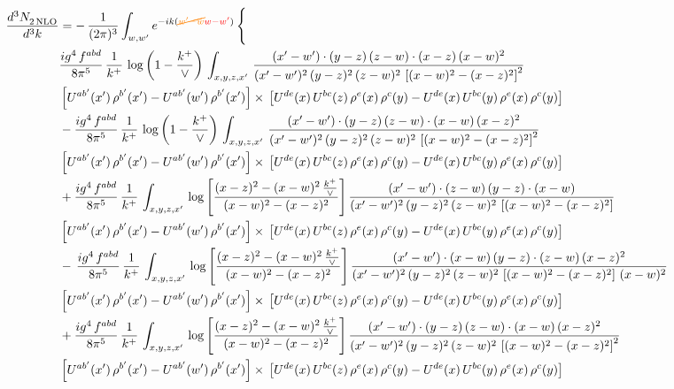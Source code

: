 \documentclass[9pt]{article}
\numberwithin{equation}{section}
\begin{document}
\begin{align}
   \frac{d^{3}N_{2\,\rm NLO}^{\rm}}{d^{3}k}  & =  -\,\frac{1}{(2\pi)^{3}}  \int_{w, w^\prime} e^{-ik({\color{orange}\cancel{w^\prime-w}}{\color{red}w-w^\prime})}\, \Bigg\{\notag \\ &  \frac{ig^{4}\, f^{abd}}{8\pi^{5}}\, \frac{1}{k^{+}}\,\log{\left(1-\frac{k^{+}}{\vee}\right)}\, \int_{x,y,z,x'}\,\frac{(x'-w')\cdot  (y-z)\, (z-w)\cdot (x-z)\, (x-w)^{2}}{(x'-w')^{2}\, (y-z)^{2}\, (z-w)^{2}\,\left[(x-w)^{2}-(x-z)^{2}\right]^{2}}\, \notag \\ & \left[U^{ab'}(x')\,\rho^{b'}(x')-U^{ab'}(w')\, \rho^{b'}(x')\right]\times\,\left[U^{de}(x)\,U^{bc}(z)\, \rho^{e}(x)\,\rho^{c}(y)-U^{de}(x)\,U^{bc}(y)\,\rho^{e}(x)\,\rho^{c}(y)\right] \notag \\ &   - \frac{ig^{4}\, f^{abd}}{8\pi^{5}}\, \frac{1}{k^{+}}\,\log{\left(1-\frac{k^{+}}{\vee}\right)}\, \int_{x,y,z,x'}\,\frac{(x'-w')\cdot  (y-z)\, (z-w)\cdot (x-w)\, (x-z)^{2}}{(x'-w')^{2}\, (y-z)^{2}\, (z-w)^{2}\,\left[(x-w)^{2}-(x-z)^{2}\right]^{2}}\, \notag \\ & \left[U^{ab'}(x')\,\rho^{b'}(x')-U^{ab'}(w')\, \rho^{b'}(x')\right]\times\,\left[U^{de}(x)\,U^{bc}(z)\, \rho^{e}(x)\,\rho^{c}(y)-U^{de}(x)\,U^{bc}(y)\,\rho^{e}(x)\,\rho^{c}(y)\right] \notag \\
&  + \frac{ig^{4}\, f^{abd}}{8\pi^{5}}\, \frac{1}{k^{+}}\, \int_{x,y,z,x'}\,\log{\left[\frac{(x-z)^{2}-(x-w)^{2}\,\frac{k^{+}}{\vee}}{(x-w)^{2}-(x-z)^{2}}\right]}\,\frac{(x'-w')\cdot (z-w)\, (y-z)\cdot (x-w)}{(x'-w')^{2}\, (y-z)^{2}\, (z-w)^{2}\,\left[(x-w)^{2}-(x-z)^{2}\right]}\, \notag \\ & \left[U^{ab'}(x')\,\rho^{b'}(x')-U^{ab'}(w')\, \rho^{b'}(x')\right]\times\,\left[U^{de}(x)\,U^{bc}(z)\, \rho^{e}(x)\,\rho^{c}(y)-U^{de}(x)\,U^{bc}(y)\,\rho^{e}(x)\,\rho^{c}(y)\right] \notag \\
& -\,\frac{ig^{4}\, f^{abd}}{8\pi^{5}}\, \frac{1}{k^{+}}\, \int_{x,y,z,x'}\,\log{\left[\frac{(x-z)^{2}-(x-w)^{2}\,\frac{k^{+}}{\vee}}{(x-w)^{2}-(x-z)^{2}}\right]}\,\frac{(x'-w')\cdot (x-w)\, (y-z)\cdot(z-w)\,(x-z)^{2}}{(x'-w')^{2}\, (y-z)^{2}\, (z-w)^{2}\,\left[(x-w)^{2}-(x-z)^{2}\right]\,(x-w)^{2}}\, \notag \\ & \left[U^{ab'}(x')\,\rho^{b'}(x')-U^{ab'}(w')\, \rho^{b'}(x')\right]\times\,\left[U^{de}(x)\,U^{bc}(z)\, \rho^{e}(x)\,\rho^{c}(y)-U^{de}(x)\,U^{bc}(y)\,\rho^{e}(x)\,\rho^{c}(y)\right] \notag \\
& +\frac{ig^{4}\, f^{abd}}{8\pi^{5}}\, \frac{1}{k^{+}}\, \int_{x,y,z,x'}\,\log{\left[\frac{(x-z)^{2}-(x-w)^{2}\,\frac{k^{+}}{\vee}}{(x-w)^{2}-(x-z)^{2}}\right]}\,\frac{(x'-w')\cdot  (y-z)\, (z-w)\cdot (x-w)\, (x-z)^{2}}{(x'-w')^{2}\, (y-z)^{2}\, (z-w)^{2}\,\left[(x-w)^{2}-(x-z)^{2}\right]^{2}}\, \notag \\ & \left[U^{ab'}(x')\,\rho^{b'}(x')-U^{ab'}(w')\, \rho^{b'}(x')\right]\times\,\left[U^{de}(x)\,U^{bc}(z)\, \rho^{e}(x)\,\rho^{c}(y)-U^{de}(x)\,U^{bc}(y)\,\rho^{e}(x)\,\rho^{c}(y)\right] \notag \\

\end{align}
\end{document}
